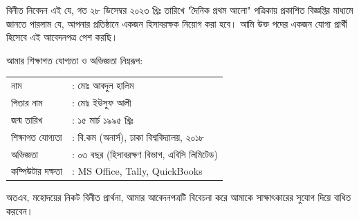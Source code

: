 \documentclass{../bdletter}
\begin{document}
\PrintLetterHeader

বিনীত নিবেদন এই যে, গত ২৮ ডিসেম্বর ২০২৩ খ্রিঃ তারিখে "দৈনিক প্রথম আলো" পত্রিকায়
প্রকাশিত বিজ্ঞপ্তির মাধ্যমে জানতে পারলাম যে, আপনার প্রতিষ্ঠানে একজন হিসাবরক্ষক
নিয়োগ করা হবে। আমি উক্ত পদের একজন যোগ্য প্রার্থী হিসেবে এই আবেদনপত্র পেশ করছি।

আমার শিক্ষাগত যোগ্যতা ও অভিজ্ঞতা নিম্নরূপ:

\begin{tabular}{@{}ll}
নাম               & : মোঃ আবদুল হালিম \\
পিতার নাম         & : মোঃ ইউসুফ আলী \\
জন্ম তারিখ        & : ১৫ মার্চ ১৯৯৫ খ্রিঃ \\
শিক্ষাগত যোগ্যতা  & : বি.কম (অনার্স), ঢাকা বিশ্ববিদ্যালয়, ২০১৮ \\
অভিজ্ঞতা          & : ০৩ বছর (হিসাবরক্ষণ বিভাগ, এবিসি লিমিটেড) \\
কম্পিউটার দক্ষতা  & : MS Office, Tally, QuickBooks \\
\end{tabular}

অতএব, মহোদয়ের নিকট বিনীত প্রার্থনা, আমার আবেদনপত্রটি বিবেচনা করে আমাকে
সাক্ষাৎকারের সুযোগ দিয়ে বাধিত করবেন।

\PrintLetterFooter
\end{document}

